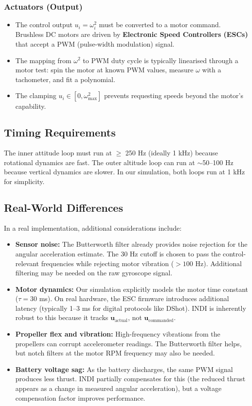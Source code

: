 \documentclass[12pt, a4paper]{article}
\newcommand{\bu}{\bm{u}}
\begin{document}
\subsubsection{Actuators (Output)}
\begin{itemize}
    \item The control output $u_i = \omega_i^2$ must be converted to a motor command.  Brushless DC motors are driven by \textbf{Electronic Speed Controllers (ESCs)} that accept a PWM (pulse-width modulation) signal.
    \item The mapping from $\omega^2$ to PWM duty cycle is typically linearised through a motor test: spin the motor at known PWM values, measure $\omega$ with a tachometer, and fit a polynomial.
    \item The clamping $u_i \in [0, \omega_{\max}^2]$ prevents requesting speeds beyond the motor's capability.
\end{itemize}

\subsection{Timing Requirements}

The inner attitude loop must run at $\geq$ 250 Hz (ideally 1 kHz) because rotational dynamics are fast.  The outer altitude loop can run at $\sim$50--100 Hz because vertical dynamics are slower.  In our simulation, both loops run at 1 kHz for simplicity.

\subsection{Real-World Differences}

In a real implementation, additional considerations include:
\begin{itemize}
    \item \textbf{Sensor noise:} The Butterworth filter already provides noise rejection for the angular acceleration estimate.  The 30 Hz cutoff is chosen to pass the control-relevant frequencies while rejecting motor vibration ($> 100$ Hz).  Additional filtering may be needed on the raw gyroscope signal.
    \item \textbf{Motor dynamics:} Our simulation explicitly models the motor time constant ($\tau = 30$ ms).  On real hardware, the ESC firmware introduces additional latency (typically 1--3 ms for digital protocols like DShot).  INDI is inherently robust to this because it tracks $\bu_{\text{actual}}$, not $\bu_{\text{commanded}}$.
    \item \textbf{Propeller flex and vibration:} High-frequency vibrations from the propellers can corrupt accelerometer readings.  The Butterworth filter helps, but notch filters at the motor RPM frequency may also be needed.
    \item \textbf{Battery voltage sag:} As the battery discharges, the same PWM signal produces less thrust.  INDI partially compensates for this (the reduced thrust appears as a change in measured angular acceleration), but a voltage compensation factor improves performance.
\end{itemize}
\end{document}
